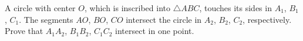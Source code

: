 A circle with center $O$, which is inscribed into $\triangle ABC$, touches its sides in $A_1$, $B_1$, $C_1$. The segments $AO$, $BO$, $CO$ intersect the circle in $A_2$, $B_2$, $C_2$, respectively. Prove that $A_1A_2$, $B_1B_2$, $C_1C_2$ intersect in one point.
